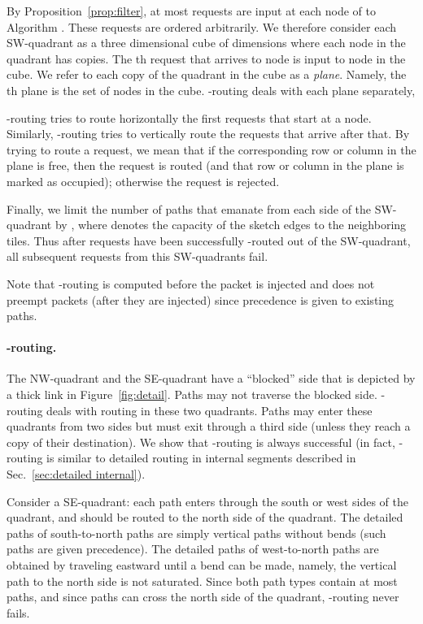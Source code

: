 \documentclass[11pt]{article}
\newcommand{\route}{\text{\sc{ipp}}}
\newenvironment{proof sketch}[1]{\noindent {\emph{Proof sketch of #1:}}}{\hfill \qed}
\begin{document}
By Proposition~\ref{prop:filter}, at most  requests
are input at each node of  to Algorithm \route.
These requests are ordered arbitrarily.  We therefore
consider each SW-quadrant as a three dimensional cube of
dimensions  where each node in the quadrant has  copies.
The th request that arrives to node  is input to
node  in the cube.  We refer to each copy of the
quadrant in the cube as a \emph{plane}.  Namely, the th
plane is the set of nodes  in the cube.
-routing deals with each  plane separately,

-routing tries to route horizontally the first  requests that
start at a node. Similarly, -routing tries to vertically route the
 requests that arrive after that.  By trying to route a request,
we mean that if the corresponding row or column in the plane is free,
then the request is routed (and that row or column in the plane is
marked as occupied); otherwise the request is rejected.

Finally, we  limit the number of paths that emanate from each
side of the SW-quadrant by , where  denotes the capacity
of the sketch edges to the neighboring tiles. Thus after  requests have been successfully
-routed out of the SW-quadrant, all subsequent requests from this
SW-quadrants fail.

 Note that -routing is computed
before the packet is injected and does not preempt packets (after they are injected) since
precedence is given to existing paths.

\paragraph{-routing.}
The NW-quadrant and the SE-quadrant have a ``blocked'' side
that is depicted by a thick link in
Figure~\ref{fig:detail}. Paths may not traverse the blocked
side. -routing deals with routing in these two
quadrants. Paths may enter these quadrants from two sides
but must exit through a third side (unless they reach a
copy of their destination).  We show that -routing is
always successful (in fact, -routing is similar to
detailed routing in internal segments described in
Sec.~\ref{sec:detailed internal}).

Consider a SE-quadrant: each path enters through the south or west sides of the
quadrant, and should be routed to the north side of the quadrant. The detailed paths
of south-to-north paths are simply vertical paths without bends (such paths are given
precedence). The detailed paths of west-to-north paths are obtained by traveling
eastward until a bend can be made, namely, the vertical path to the north side is not
saturated.  Since both path types contain at most  paths, and since 
paths can cross the north side of the quadrant, -routing never fails.
\end{document}
